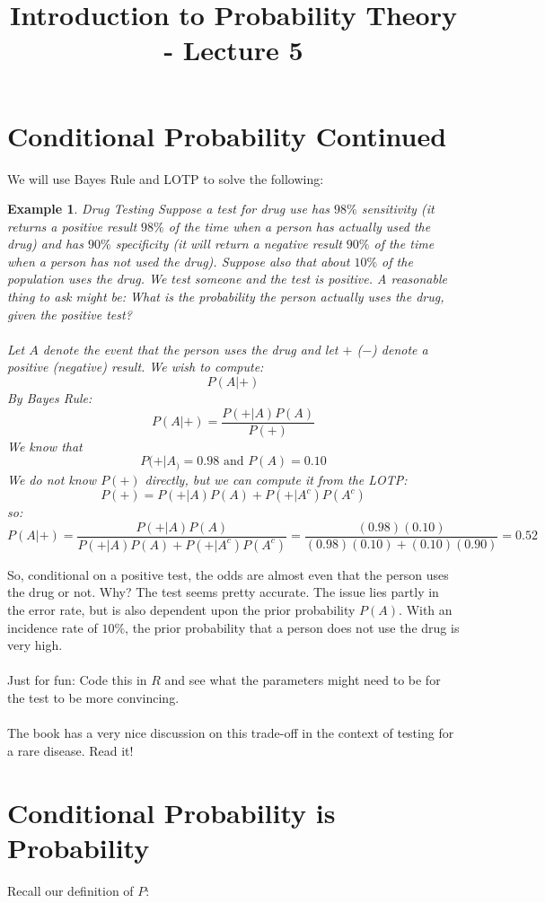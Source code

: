 \documentclass[12pt]{article} %
\title{Introduction to Probability Theory - Lecture 5}
\newtheorem{example}{Example}
\begin{document}
\maketitle
\section{Conditional Probability Continued}
We will use Bayes Rule and LOTP to solve the following:
\begin{example}{Drug Testing}
Suppose a test for drug use has $98 \%$ sensitivity (it returns a positive result $98\%$ of the time when a person has actually used the drug) and has $90\%$ specificity (it will return a negative result $90\%$ of the time when a person has not used the drug). Suppose also that about $10\%$ of the population uses the drug. We test someone and the test is positive. A reasonable thing to ask might be: What is the probability the person actually uses the drug, given the positive test?\\\\
Let $A$ denote the event that the person uses the drug and let $+$ ($-$)  denote a positive (negative) result. We wish to compute:
$$P(A|+)$$
By Bayes Rule:
$$P(A|+) = \frac{P(+|A)P(A)}{P(+)}$$
We know that
$$P(+|A_) = 0.98 \textrm{ and } P(A) =0.10$$
We do not know $P(+)$ directly, but we can compute it from the LOTP:
$$P(+) = P(+|A)P(A) + P(+|A^c)P(A^c)$$
so:
$$P(A|+) = \frac{P(+|A)P(A)}{P(+|A)P(A) + P(+|A^c)P(A^c)} = \frac{(0.98)(0.10)}{(0.98)(0.10)+(0.10)(0.90)} = 0.52$$
\end{example}
So, conditional on a positive test, the odds are almost even that the person uses the drug or not. Why? The test seems pretty accurate. The issue lies partly in the error rate, but is also dependent upon the prior probability $P(A)$. With an incidence rate of $10\%$, the prior probability that a person does not use the drug is very high.\\\\
Just for fun: Code this in $R$ and see what the parameters might need to be for the test to be more convincing.\\\\
The book has a very nice discussion on this trade-off in the context of testing for a rare disease. Read it!
\section{Conditional Probability is Probability}
Recall our definition of $P$:\\
\end{document}
